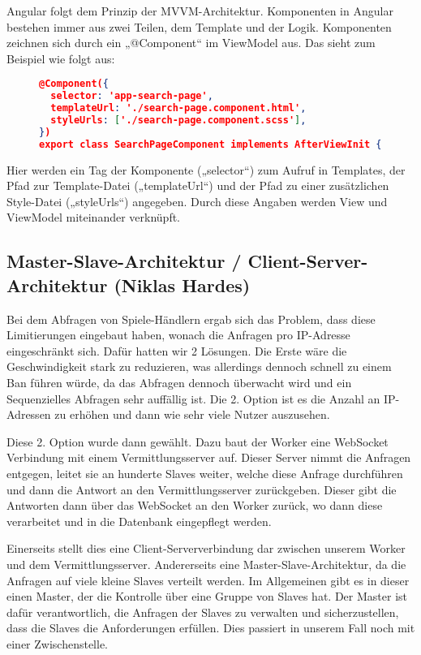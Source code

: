 Angular folgt dem Prinzip der MVVM-Architektur. Komponenten in Angular bestehen immer aus zwei Teilen, dem Template und der Logik. Komponenten zeichnen sich durch ein „@Component“ im ViewModel aus. Das sieht zum Beispiel wie folgt aus:

\begin{figure}[bht]
\begin{lstlisting}[caption=Codeausschnitt der SearchPageComponent,language=json]
@Component({
  selector: 'app-search-page',
  templateUrl: './search-page.component.html',
  styleUrls: ['./search-page.component.scss'],
})
export class SearchPageComponent implements AfterViewInit {...}
\end{lstlisting}
\end{figure}

Hier werden ein Tag der Komponente („selector“) zum Aufruf in Templates, der Pfad zur Template-Datei („templateUrl“) und der Pfad zu einer zusätzlichen Style-Datei („styleUrls“) angegeben. Durch diese Angaben werden View und ViewModel miteinander verknüpft.


\subsection*{Master-Slave-Architektur / Client-Server-Architektur (Niklas Hardes)}

Bei dem Abfragen von Spiele-Händlern ergab sich das Problem, dass diese Limitierungen eingebaut haben, wonach die Anfragen pro IP-Adresse eingeschränkt sich. Dafür hatten wir 2 Lösungen. Die Erste wäre die Geschwindigkeit stark zu reduzieren, was allerdings dennoch schnell zu einem Ban führen würde, da das Abfragen dennoch überwacht wird und ein Sequenzielles Abfragen sehr auffällig ist.
Die 2. Option ist es die Anzahl an IP-Adressen zu erhöhen und dann wie sehr viele Nutzer auszusehen.

Diese 2. Option wurde dann gewählt. Dazu baut der Worker eine WebSocket Verbindung mit einem Vermittlungsserver auf. Dieser Server nimmt die Anfragen entgegen, leitet sie an hunderte Slaves weiter, welche diese Anfrage durchführen und dann die Antwort an den Vermittlungsserver zurückgeben.
Dieser gibt die Antworten dann über das WebSocket an den Worker zurück, wo dann diese verarbeitet und in die Datenbank eingepflegt werden.

Einerseits stellt dies eine Client-Serververbindung dar zwischen unserem Worker und dem Vermittlungsserver. Andererseits eine Master-Slave-Architektur, da die Anfragen auf viele kleine Slaves verteilt werden. Im Allgemeinen gibt es in dieser einen Master, der die Kontrolle über eine Gruppe von Slaves hat. Der Master ist dafür verantwortlich, die Anfragen der Slaves zu verwalten und sicherzustellen, dass die Slaves die Anforderungen erfüllen. Dies passiert in unserem Fall noch mit einer Zwischenstelle.


